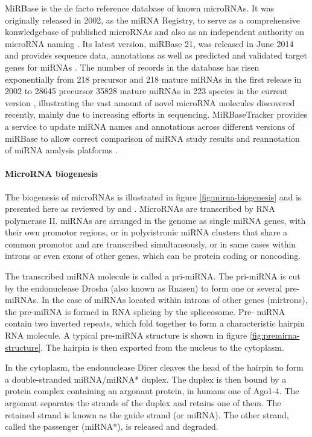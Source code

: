 MiRBase is the de facto reference database of known microRNAs. It was
originally released in 2002, as the miRNA Registry, to serve as a
comprehensive konwledgebase of published microRNAs and also as an independent
authority on microRNA naming \citep{Griffiths2004}. Its latest version,
miRBase 21, was released in June 2014 \citep{MiRBaseWeb} and provides sequence
data, annotations as well as predicted and validated target genes for miRNAs
\citep{Kozomara2014}. The number of records in the database has risen
exponentially from 218 precursor and 218 mature miRNAs in the first release in
2002 to 28645 precursor 35828 mature miRNAs in 223 species in the current
version \citep{VanPeer2014,MiRBaseWeb}, illustrating the vast amount of novel
microRNA molecules discovered recently, mainly due to increasing efforts in
sequencing. MiRBaseTracker provides a service to update miRNA names and
annotations across different versions of miRBase to allow correct comparison
of miRNA study results and reannotation of miRNA analysis platforms
\citep{VanPeer2014}.





\paragraph{MicroRNA biogenesis}\label{microrna-biogenesis}

The biogenesis of microRNAs is illustrated in figure
\ref{fig:mirna-biogenesis} and is presented here as reviewed by  
\citet{Bartel2004} and \citet{Denzler2015}. MicroRNAs are
transcribed by RNA polymerase II. miRNAs are arranged in the genome as
single miRNA genes, with their own promotor regions,
or in polycistronic miRNA clusters that share a common promotor and are
transcribed simultaneously, or in same cases within introns or even exons of
other genes, which can be protein coding or noncoding.

The transcribed miRNA molecule is called a pri-miRNA. The pri-miRNA is cut by
the endonuclease Drosha (also known as Rnasen) to form one or several pre-
miRNAs. In the case of miRNAs located within introns of other genes
(mirtrons), the pre-miRNA is formed in RNA splicing by the spliceosome. Pre-
miRNA contain two inverted repeats, which fold together to form a
characteristic hairpin RNA molecule. A typical pre-miRNA structure is shown in
figure \ref{fig:premirna-structure}. The hairpin is then exported from the
nucleus to the cytoplasm.

In the cytoplasm, the endonuclease Dicer cleaves the head of the hairpin to
form a double-stranded miRNA/miRNA* duplex. The duplex is then bound by a
protein complex containing an argonaut protein, in humans one of Ago1-4. The
argonaut separates the strands of the duplex and retains one of them. The
retained strand is known as the guide strand (or miRNA). The other strand,
called the passenger (miRNA*), is released and degraded.

